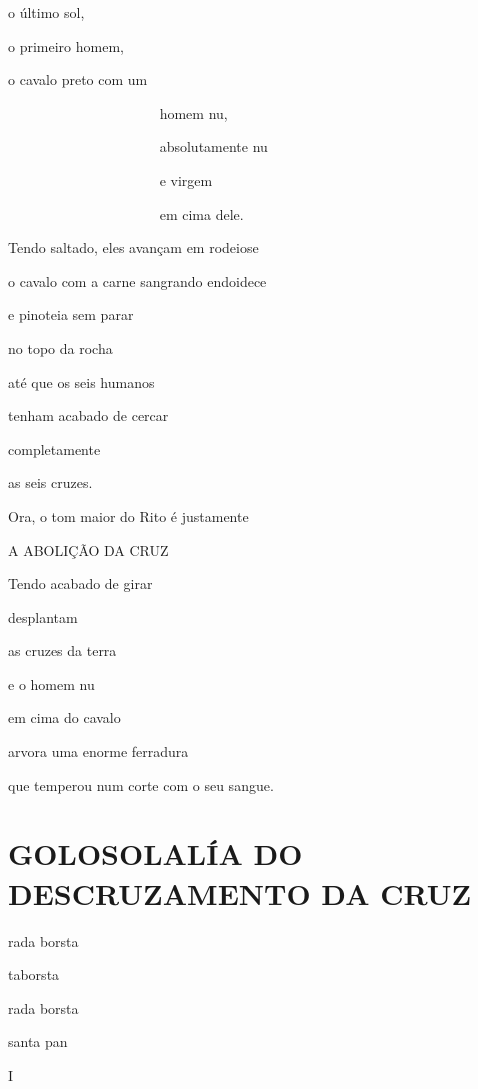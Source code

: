 o último sol, 

o primeiro homem,

o cavalo preto com um

~~~~~~~~~~~~~~~~~~~~~ homem nu,

~~~~~~~~~~~~~~~~~~~~~ absolutamente nu

~~~~~~~~~~~~~~~~~~~~~ e virgem

~~~~~~~~~~~~~~~~~~~~~ em cima dele.

Tendo saltado, eles avançam em rodeiose

o cavalo com a carne sangrando endoidece

e pinoteia sem parar

no topo da rocha

até que os seis humanos

tenham acabado de cercar

completamente

as seis cruzes.

Ora, o tom maior do Rito é justamente

A ABOLIÇÃO DA CRUZ

Tendo acabado de girar

desplantam

as cruzes da terra

e o homem nu

em cima do cavalo~

arvora uma enorme ferradura

que temperou num corte com o seu sangue.



\mbox{}\vspace*{\fill}
\section*{GOLOSOLALÍA DO DESCRUZAMENTO DA CRUZ}

\begin{center}

rada borsta

taborsta

rada borsta

santa pan

I
\end{center}
\mbox{}\vspace*{\fill}
~

